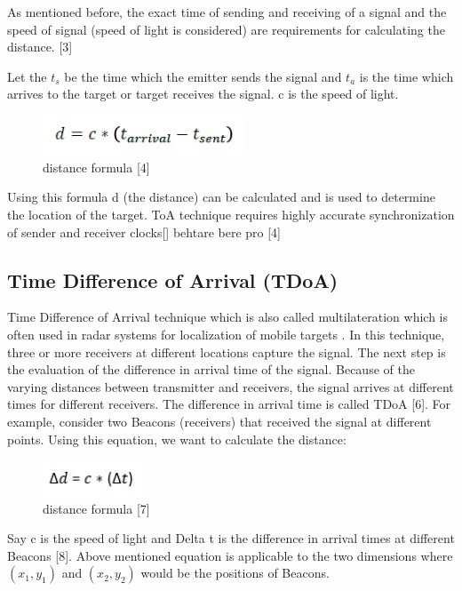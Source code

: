 As mentioned before, the exact time of sending and receiving of a signal and the speed of signal (speed of light is considered) are requirements for calculating the distance. [3]

Let the $t_s$ be the time which the emitter sends the signal and $t_a$ is the time which arrives to the target or target receives the signal. c is the speed of light.

\begin{figure}[htp]
    \centering
    \includegraphics[width=6cm]{3.jpg}
    \caption{distance formula [4]}
    \label{fig:Localization}
\end{figure}
Using this formula d (the distance) can be calculated and is used to determine the location of the target. ToA technique requires highly accurate synchronization of sender and receiver clocks[] behtare bere pro [4]




\subsection{Time Difference of Arrival (TDoA)}
Time Difference of Arrival technique which is also called multilateration which is often used in radar systems for localization of mobile targets \cite{schaefer15}. In this technique, three or more receivers at different locations capture the signal. The next step is the evaluation of the difference in arrival time of the signal. Because of the varying distances between transmitter and receivers, the signal arrives at different times for different receivers. The difference in arrival time is called TDoA [6].
For example, consider two Beacons (receivers) that received the signal at different points. Using this equation, we want to calculate the distance:

\begin{figure}[htp]
    \centering
    \includegraphics[width=3cm]{4.jpg}
    \caption{distance formula [7]}
    \label{fig:formula}
\end{figure}

Say c is the speed of light and Delta t is the difference in arrival times at different Beacons [8]. Above mentioned equation is applicable to the two dimensions where $(x_1,y_1)$ and $(x_2,y_2)$ would be the positions of Beacons.



